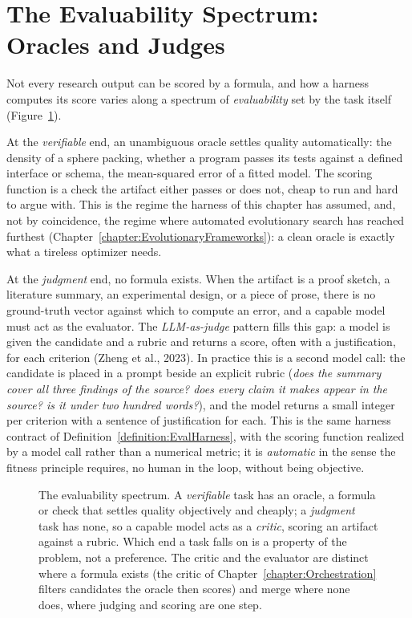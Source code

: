 \section{The Evaluability Spectrum: Oracles and Judges}
\label{section:LLMJudge}

Not every research output can be scored by a formula, and how a harness computes its score varies along a spectrum of \emph{evaluability} set by the task itself (Figure~\ref{figure:EvaluabilitySpectrum}).

At the \emph{verifiable} end, an unambiguous oracle settles quality automatically: the density of a sphere packing, whether a program passes its tests against a defined interface or schema, the mean-squared error of a fitted model.
The scoring function is a check the artifact either passes or does not, cheap to run and hard to argue with.
This is the regime the harness of this chapter has assumed, and, not by coincidence, the regime where automated evolutionary search has reached furthest (Chapter~\ref{chapter:EvolutionaryFrameworks}): a clean oracle is exactly what a tireless optimizer needs.

At the \emph{judgment} end, no formula exists.
When the artifact is a proof sketch, a literature summary, an experimental design, or a piece of prose, there is no ground-truth vector against which to compute an error, and a capable model must act as the evaluator.
The \emph{LLM-as-judge} pattern fills this gap: a model is given the candidate and a rubric and returns a score, often with a justification, for each criterion (Zheng et al., 2023).
In practice this is a second model call: the candidate is placed in a prompt beside an explicit rubric (\emph{does the summary cover all three findings of the source? does every claim it makes appear in the source? is it under two hundred words?}), and the model returns a small integer per criterion with a sentence of justification for each.
This is the same harness contract of Definition~\ref{definition:EvalHarness}, with the scoring function realized by a model call rather than a numerical metric; it is \emph{automatic} in the sense the fitness principle requires, no human in the loop, without being objective.

\begin{figure}[htb!]
\begin{center}

\caption{The evaluability spectrum.
A \emph{verifiable} task has an oracle, a formula or check that settles quality objectively and cheaply; a \emph{judgment} task has none, so a capable model acts as a \emph{critic}, scoring an artifact against a rubric.
Which end a task falls on is a property of the problem, not a preference.
The critic and the evaluator are distinct where a formula exists (the critic of Chapter~\ref{chapter:Orchestration} filters candidates the oracle then scores) and merge where none does, where judging and scoring are one step.}
\label{figure:EvaluabilitySpectrum}
\end{center}
\end{figure}

